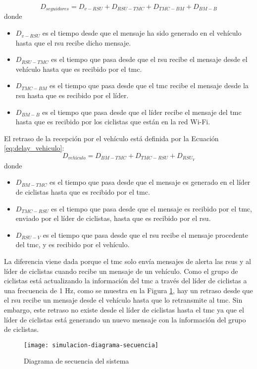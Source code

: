 \begin{equation}\label{eq:delay_seguidores}
D_{seguidores} = D_{v-RSU} + D_{RSU-TMC} + D_{TMC-BM} + D_{BM-B}
\end{equation}
donde
\begin{itemize}
	\item $D_{v-RSU}$ es el tiempo desde que el mensaje ha sido generado en el
	vehículo hasta que el \gls{rsu} recibe dicho mensaje.

	\item $D_{RSU-TMC}$ es el tiempo que pasa desde que el \gls{rsu} recibe el
	mensaje desde el vehículo hasta que es recibido por el \gls{tmc}.

	\item $D_{TMC-BM}$ es el tiempo que pasa desde que el \gls{tmc} recibe el
	mensaje desde la \gls{rsu} hasta que es recibido por el líder.

	\item $D_{BM-B}$ es el tiempo que pasa desde que el líder recibe el mensaje
	del \gls{tmc} hasta que es recibido por los ciclistas que están en la red
	Wi-Fi.
\end{itemize}

El retraso de la recepción por el vehículo está definida por la Ecuación
\ref{eq:delay_vehiculo}:
\begin{equation}\label{eq:delay_vehiculo}
D_{vehículo} = D_{BM-TMC} + D_{TMC-RSU} + D_{RSU_V}
\end{equation}
donde
\begin{itemize}
	\item $D_{BM-TMC}$ es el tiempo que pasa desde que el mensaje es generado en
	el líder de ciclistas hasta que es recibido por el \gls{tmc}.

	\item $D_{TMC-RSU}$ es el tiempo que pasa desde que el mensaje es recibido
	por el \gls{tmc}, enviado por el líder de ciclistas, hasta que es recibido
	por el \gls{rsu}.

	\item $D_{RSU-V}$ es el tiempo que pasa desde que el \gls{rsu} recibe el
	mensaje procedente del \gls{tmc}, y es recibido por el vehículo.
\end{itemize}

La diferencia viene dada porque el \gls{tmc} solo envía mensajes de alerta las
\gls{rsu}s y al líder de ciclistas cuando recibe un mensaje de un vehículo.
Como el grupo de ciclistas está actualizando la información del \gls{tmc} a
través del líder de ciclistas a una frecuencia de 1 Hz, como se muestra en la
Figura \ref{fig:simulacion-diagrama-secuencia}, hay un retraso desde que el
\gls{rsu} recibe un mensaje desde el vehículo hasta que lo retransmite al
\gls{tmc}. Sin embargo, este retraso no existe desde el líder de ciclistas
hasta el \gls{tmc} ya que el líder de ciclistas está generando un nuevo mensaje
con la información del grupo de ciclistas.

\begin{figure}[ht]
	\texttt{[image: simulacion-diagrama-secuencia]}
	\caption{Diagrama de secuencia del sistema}
	\label{fig:simulacion-diagrama-secuencia}
\end{figure}

